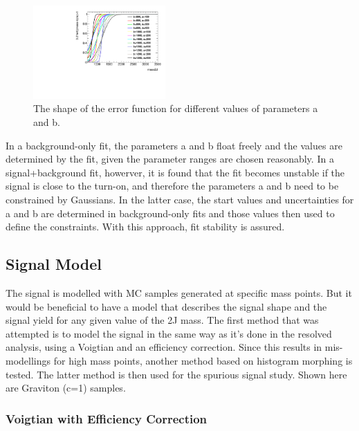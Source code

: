 \begin{figure}[htbp!]
\begin{center}
\includegraphics[width=0.45\textwidth,angle=-90]{figures/boosted/app-directfit/erf_parameters.pdf}
\caption{The shape of the error function for different values of parameters a and b.}
\label{fig:directfit:erf}
\end{center}
\end{figure}

In a background-only fit, the parameters a and b float freely and the values are determined by the fit, given the parameter ranges are chosen reasonably. In a signal+background fit, howerver, it is found that the fit becomes unstable if the signal is close to the turn-on, and therefore the parameters a and b need to be constrained by Gaussians. In the latter case, the start values and uncertainties for a and b are determined in background-only fits and those values then used to define the constraints. With this approach, fit stability is assured.

\subsection{Signal Model}

The signal is modelled with MC samples generated at specific mass points. But it would be beneficial to have a model that describes the signal shape and the signal yield for any given value of the 2J mass. The first method that was attempted is to model the signal in the same way as it's done in the resolved analysis, using a Voigtian and an efficiency correction. Since this results in mis-modellings for high mass points, another method based on histogram morphing is tested. The latter method is then used for the spurious signal study. Shown here are Graviton (c=1) samples.

\subsubsection{Voigtian with Efficiency Correction}

